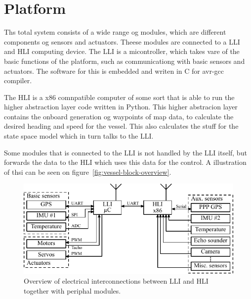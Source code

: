 \chapter{Platform}

Ths total system consists of a wide range og modules, which are different components og sensors and actuators. Theese modules are connected to a \ac{LLI} and \ac{HLI} computing device. The \ac{LLI} is a micontroller, which takes vare of the basic functions of the platform, such as communicationg with basic sensors and actuators. The software for this is embedded and writen in C for avr-gcc compiler.

The \ac{HLI} is a x86 comnpatible computer of some sort that is able to run the higher abstraction layer code written in Python. This higher abstracion layer contains the onboard generation og waypoints of map data, to calculate the desired heading and speed for the vessel. This also calculates the stuff for the state space model which in turn talks to the \ac{LLI}.

Some modules that is connected to the \ac{LLI} is not handled by the \ac{LLI} itself, but forwards the data to the \ac{HLI} which uses this data for the control. A illustration of thsi can be seen on figure~\vref{fig:vessel-block-overview}.


\begin{figure}[htbp]
	\centering
	\includegraphics[width=\textwidth]{img/vessel-block-overview-electrical}
	\caption{Overview of electrical interconnections between \ac{LLI} and \ac{HLI} together with periphal modules.}
	\label{fig:vessel-block-overview-electrical}
\end{figure}
